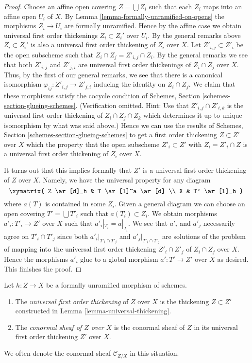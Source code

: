 \begin{proof}
\medskip\noindent
Choose an affine open covering $Z = \bigcup Z_i$ such that each $Z_i$
maps into an affine open $U_i$ of $X$. By
Lemma \ref{lemma-formally-unramified-on-opens}
the morphisms $Z_i \to U_i$ are formally unramified.
Hence by the affine case we obtain universal first order thickenings
$Z_i \subset Z_i'$ over $U_i$. By the general remarks above
$Z_i \subset Z_i'$ is also a universal first order thickening of
$Z_i$ over $X$. Let $Z'_{i, j} \subset Z'_i$ be the open subscheme
such that $Z_i \cap Z_j = Z'_{i, j} \cap Z_i$. By the general remarks
we see that both $Z'_{i, j}$ and $Z'_{j, i}$ are universal first
order thickenings of $Z_i \cap Z_j$ over $X$. Thus, by
the first of our general remarks, we see that there is a canonical isomorphism
$\varphi_{ij} : Z'_{i, j} \to Z'_{j, i}$ inducing the identity on
$Z_i \cap Z_j$. We claim that these morphisms satisfy the cocycle condition of
Schemes, Section \ref{schemes-section-glueing-schemes}.
(Verification omitted. Hint: Use that $Z'_{i, j} \cap Z'_{i, k}$ is the
universal first order thickening of $Z_i \cap Z_j \cap Z_k$ which determines
it up to unique isomorphism by what was said above.)
Hence we can use the results of
Schemes, Section \ref{schemes-section-glueing-schemes}
to get a first order thickening $Z \subset Z'$ over $X$ which the property
that the open subscheme $Z'_i \subset Z'$ with $Z_i = Z'_i \cap Z$
is a universal first order thickening of $Z_i$ over $X$.

\medskip\noindent
It turns out that this implies formally that $Z'$ is a universal first order
thickening of $Z$ over $X$. Namely, we have the universal property for any
diagram
$$
\xymatrix{
Z \ar[d]_h & T \ar[l]^a \ar[d] \\
X & T' \ar[l]_b
}
$$
where $a(T)$ is contained in some $Z_i$. Given a general diagram we can
choose an open covering $T' = \bigcup T'_i$ such that $a(T_i) \subset Z_i$.
We obtain morphisms $a'_i : T'_i \to Z'$ over $X$ such that
$a'_i|_{T_i} = a|_{T_i}$. We see that $a'_i$ and $a'_j$ necessarily agree
on $T'_i \cap T'_j$ since both $a'_i|_{T'_i \cap T'_j}$ and
$a'_j|_{T'_i \cap T'_j}$ are solutions of the problem of mapping into the
universal first order thickening $Z'_i \cap Z'_j$ of $Z_i \cap Z_j$ over $X$.
Hence the morphisms $a'_i$ glue to a global morphism
$a' : T' \to Z'$ over $X$ as desired. This finishes the proof.
\end{proof}

\begin{definition}
\label{definition-universal-thickening}
Let $h : Z \to X$ be a formally unramified morphism of schemes.
\begin{enumerate}
\item The {\it universal first order thickening} of $Z$ over $X$
is the thickening $Z \subset Z'$ constructed in
Lemma \ref{lemma-universal-thickening}.
\item The {\it conormal sheaf of $Z$ over $X$} is the conormal sheaf
of $Z$ in its universal first order thickening $Z'$ over $X$.
\end{enumerate}
We often denote the conormal sheaf $\mathcal{C}_{Z/X}$ in this situation.
\end{definition}

